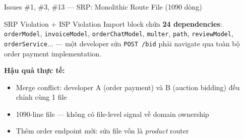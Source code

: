 \documentclass[12pt]{beamer}
\begin{document}
\begin{frame}{Issues \#1, \#3, \#13 — SRP: Monolithic Route File (1090 dòng)}
  \medskip
  \begin{alertblock}{SRP Violation + ISP Violation}
    Import block chứa \textbf{24 dependencies}: \texttt{orderModel}, \texttt{invoiceModel},
    \texttt{orderChatModel}, \texttt{multer}, \texttt{path}, \texttt{reviewModel},
    \texttt{orderService}... — một developer sửa \texttt{POST /bid}
    phải navigate qua toàn bộ order payment implementation.
  \end{alertblock}

  \medskip
  \textbf{Hậu quả thực tế:}
  \begin{itemize}
    \item Merge conflict: developer A (order payment) và B (auction bidding) đều chỉnh cùng 1 file
    \item 1090-line file — không có file-level signal về domain ownership
    \item Thêm order endpoint mới: sửa file vốn là \textit{product} router
  \end{itemize}
\end{frame}
\end{document}

